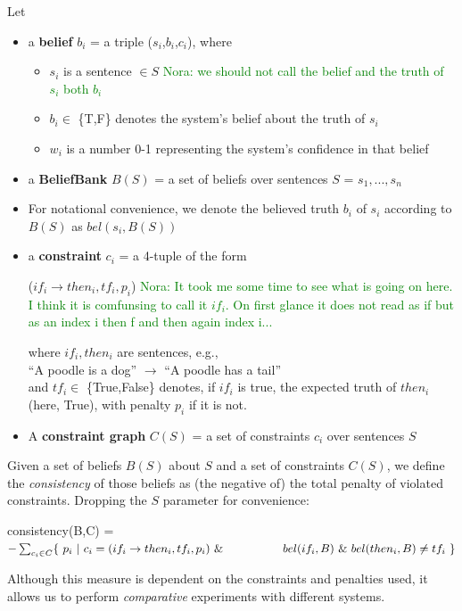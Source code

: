 \documentclass[11pt]{article}
\newcommand{\nk}[1]{\textcolor{green}{Nora: #1}}
\newenvironment{myquote}{                   %
  \parskip 0mm \begin{quoting}[vskip=0mm,leftmargin=2mm]}{
\end{quoting}}
\newenvironment{ite}{                     %
     \parskip 0cm \begin{itemize} \parskip 0cm \parsep 0cm \itemsep 0cm \topsep 0cm}{
        \end{itemize}} %
\begin{document}
\noindent Let
\vspace{-2mm}
\begin{ite}
 \item a {\bf belief} $b_i$ = a triple ($s_i$,$b_i$,$c_i$), where
    \begin{ite}
     \item $s_i$ is a sentence $\in S$ %
     \nk{we should not call the belief and the truth of $s_i$ both $b_i$}
     \item $b_i \in$ \{T,F\} denotes the system's belief about the truth of $s_i$
     \item $w_i$ is a number 0-1 representing the system's confidence in that belief
    \end{ite}
 \item a {\bf BeliefBank} $B(S)$ = a set of beliefs over sentences $S$ = $s_1,...,s_n$
 \item For notational convenience, we denote the believed truth $b_i$ of $s_i$ according to $B(S)$ as $bel(s_i,B(S))$
 \item a {\bf constraint} $c_i$ = a 4-tuple of the form
\begin{myquote} \centering
($if_i \rightarrow then_i, tf_i, p_i$)
\nk{It took me some time to see what is going on here. I think it is comfunsing to call it $if_i$. On first glance it does not read as if but as an index i then f and then again index i...}
\end{myquote} 
where $if_i, then_i$ are sentences, e.g., \\
\vspace{1mm}
\hspace*{1mm} ``A poodle is a dog'' $\rightarrow$ ``A poodle has a tail'' \\
\vspace{1mm} 
and $tf_i \in$ \{True,False\} denotes, if $if_i$ is true, the expected truth of $then_i$ (here, True),
with penalty $p_i$ if it is not.
\item A {\bf constraint graph} $C(S)$ = a set of constraints $c_i$ over sentences $S$
\end{ite}
Given a set of beliefs $B(S)$ about $S$ and a set of constraints $C(S)$, we define the {\it consistency}
of those beliefs as (the negative of) the total penalty of violated constraints.
Dropping the $S$ parameter for convenience:
 \begin{myquote}
  consistency(B,C) = \\
\hspace*{2mm}  $- \sum_{c_i \in C} \{~ p_i ~ | ~ c_i = (if_i \rightarrow then_i, tf_i, p_i )       ~\& \\
\hspace*{18mm}  bel(if_i,B) ~ \& ~ bel(then_i,B) \neq tf_i~ \}$
\end{myquote}
Although this measure is dependent on the constraints and penalties used,
it allows us to perform {\it comparative} experiments with different systems.
\end{document}
